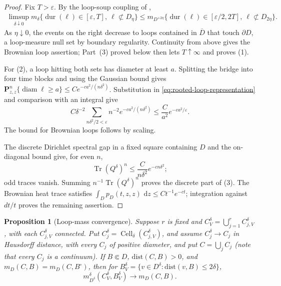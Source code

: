 \documentclass[11pt]{article}
\numberwithin{equation}{section}
\newcommand{\1}{\mathbf{1}}
\newcommand{\dist}{\mathrm{dist}}
\newtheorem{proposition}[theorem]{Proposition}
\newcommand\ol[1]{\overline{#1}}
\newcommand{\diam}{\operatorname{diam}}
\newcommand{\dd}{\,\mathrm d}
\newcommand{\Cell}{\operatorname{Cell}}
\begin{document}
\begin{proof}
Fix \(T>\varepsilon\).  By the loop-soup coupling of
\cite[Theorem~1.1 and Corollary~5.4]{LawlerTrujillo2007},
\begin{align*}
 \limsup_{\delta\downarrow0}
 m_\delta\{\operatorname{dur}(\ell)\in[\varepsilon,T],\
             \ell\not\subset D_\eta\}\leq
 m_{D^{+2\eta}}\{\operatorname{dur}(\ell)\in
                 [\varepsilon/2,2T],\
                 \ell\not\subset D_{2\eta}\}.
\end{align*}
As \(\eta\downarrow0\), the events on the right decrease to loops
contained in \(\ol D\) that touch \(\partial D\), a loop-measure null
set by boundary regularity.  Continuity from above gives the Brownian loop assertion; Part~(3) proved below then lets \(T\uparrow\infty\) and proves (1).

For (2), a loop hitting both sets has diameter at least \(a\).  Splitting
the bridge into four time blocks and using the Gaussian bound gives $\mathbf P_{z,z}^n\{\diam\ell\geq a\}
 \leq Ce^{-ca^2/(n\delta^2)}$.
Substitution in \eqref{eq:rooted-loop-representation} and comparison with an
integral give
\[
 C\delta^{-2}\sum_{n\delta^2/2<\varepsilon}
 n^{-2}e^{-ca^2/(n\delta^2)}
 \leq \frac C{a^2}e^{-ca^2/\varepsilon}.
\]
The bound for Brownian loops follows by scaling.

The discrete Dirichlet spectral gap in a fixed square containing
\(D\) and
the on-diagonal bound give, for even \(n\),
\[
 \operatorname{Tr}(Q^\delta)^n
 \leq \frac C{n\delta^2}e^{-cn\delta^2};
\]
odd traces vanish.  Summing \(n^{-1}\operatorname{Tr}(Q^\delta)^n\)
proves the discrete part of (3).  The Brownian heat trace satisfies
\(\int_Dp_D(t,z,z)\,\dd z\leq Ct^{-1}e^{-ct}\); integration against
\(dt/t\) proves the remaining assertion.
\end{proof}
\begin{proposition}[Loop-mass convergence]
\label{prop:separated-loop}
Suppose \(r\) is fixed and \(C_V^\delta=\bigcup_{j=1}^rC_{j,V}^\delta\), with each \(C_{j,V}^\delta\) connected.  Put
\(C_j^\delta=\Cell_\delta(C_{j,V}^\delta)\), and assume $C_j^\delta\longrightarrow C_j$ in Hausdorff distance,
with every \(C_j\) of positive diameter, and put
\(C=\bigcup_jC_j\) (note that every $C_j$ is a continuum).
If \(B\Subset D\), \(\dist(C,B)>0\), and $m_D(C,B)=m_D(C,B^\circ)$,
then for \(B_V^\delta=\{v\in D^\delta:\dist(v,B)\leq2\delta\}\),
\begin{equation}\label{eq:finite-component-loop-limit}
 m_{D^\delta}^\delta(C_V^\delta,B_V^\delta)
 \longrightarrow m_D(C,B).
\end{equation}
\end{proposition}
\end{document}
